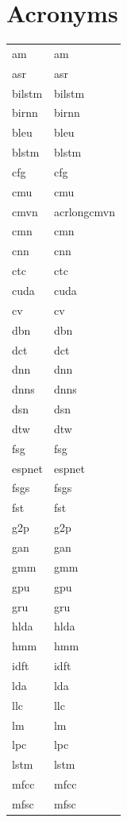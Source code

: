\documentclass[12pt,twoside]{report}
\begin{document}
\begin{table}[tp]
\chapter*{Acronyms}
  \label{tab:acronymns}
\begin{tabular}{ll}
\acrshort{am} & \acrlong{am}\\
\acrshort{asr} & \acrlong{asr}\\
\acrshort{bilstm} & \acrlong{bilstm}\\
\acrshort{birnn} & \acrlong{birnn}\\
\acrshort{bleu} & \acrlong{bleu}\\
\acrshort{blstm} & \acrlong{blstm}\\
\acrshort{cfg} & \acrlong{cfg} \\
\acrshort{cmu} & \acrlong{cmu} \\
\acrshort{cmvn} & acrlong{cmvn} \\
\acrshort{cmn} & \acrlong{cmn} \\
\acrshort{cnn} & \acrlong{cnn} \\
\acrshort{ctc} & \acrlong{ctc} \\
\acrshort{cuda} & \acrlong{cuda} \\
\acrshort{cv} & \acrlong{cv} \\
\acrshort{dbn} & \acrlong{dbn} \\
\acrshort{dct} & \acrlong{dct} \\
\acrshort{dnn} & \acrlong{dnn} \\
\acrshort{dnns} & \acrlong{dnns} \\
\acrshort{dsn} & \acrlong{dsn} \\
\acrshort{dtw} & \acrlong{dtw} \\
\acrshort{fsg} & \acrlong{fsg} \\
\acrshort{espnet} & \acrlong{espnet} \\
\acrshort{fsgs} & \acrlong{fsgs} \\
\acrshort{fst} & \acrlong{fst} \\
\acrshort{g2p} & \acrlong{g2p} \\
\acrshort{gan} & \acrlong{gan} \\
\acrshort{gmm} & \acrlong{gmm} \\
\acrshort{gpu} & \acrlong{gpu} \\
\acrshort{gru} & \acrlong{gru} \\
\acrshort{hlda} & \acrlong{hlda} \\
\acrshort{hmm} & \acrlong{hmm} \\
\acrshort{idft} & \acrlong{idft} \\
\acrshort{lda} & \acrlong{lda} \\
\acrshort{llc} & \acrlong{llc} \\
\acrshort{lm} & \acrlong{lm} \\
\acrshort{lpc} & \acrlong{lpc} \\
\acrshort{lstm} & \acrlong{lstm} \\
\acrshort{mfcc} & \acrlong{mfcc} \\
\acrshort{mfsc} & \acrlong{mfsc} \\
\end{tabular}
\end{table}
\end{document}
